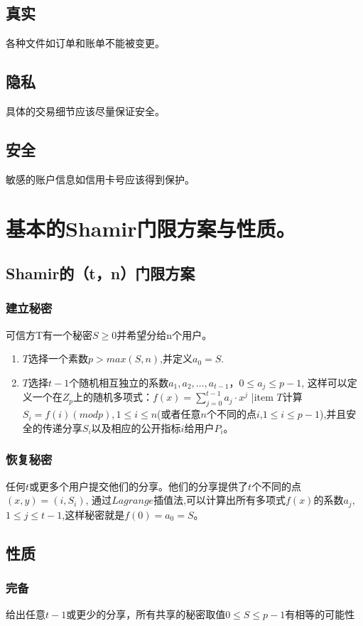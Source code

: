 \documentclass[11pt,a4paper]{article}
\begin{document}
\subsection{真实}各种文件如订单和账单不能被变更。
\subsection{隐私}具体的交易细节应该尽量保证安全。
\subsection{安全}敏感的账户信息如信用卡号应该得到保护。
\section{基本的Shamir门限方案与性质。}

\subsection{Shamir的（t，n）门限方案}
\subsubsection{建立秘密} 可信方T有一个秘密$S\ge0$并希望分给n个用户。
\begin{enumerate}[1)]
\item $T$选择一个素数$p > max(S,n)$,并定义$a_0 = S$.
\item $T$选择$t-1$个随机相互独立的系数$a_1,a_2,\dots,a_{t-1}$，$0 \le a_j \le p-1$,
这样可以定义一个在$Z_p$上的随机多项式：$f(x)= \sum_{j=0}^{t-1}a_j· x^j$
|item $T$计算$S_i = f(i)(mod p) , 1 \le i \le n$(或者任意$n$个不同的点$i$,$1 \le i \le p-1$),并且安全的传递分享$S_i$以及相应的公开指标$i$给用户$P_i$。
\end{enumerate}

\subsubsection{恢复秘密} 任何$t$或更多个用户提交他们的分享。他们的分享提供了$t$个不同的点$(x,y)=(i, S_i)$, 通过$Lagrange$插值法,可以计算出所有多项式$f(x)$的系数$a_j$,$1 \le j \le t-1$,这样秘密就是$f(0)=a_0=S$。
\subsection{性质}
\subsubsection{完备} 给出任意$t-1$或更少的分享，所有共享的秘密取值$0\le S \le p-1$有相等的可能性
\end{document}
